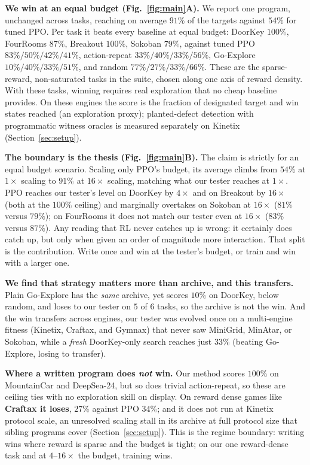 \documentclass{article}
\begin{document}
\textbf{We win at an equal budget (Fig.~\ref{fig:main}A).} We report one program, unchanged across tasks, reaching on average
$91\%$ of the targets against $54\%$ for tuned PPO. Per task it beats every baseline at equal budget: DoorKey $100\%$,
FourRooms $87\%$, Breakout $100\%$, Sokoban $79\%$, against tuned PPO $83\%/50\%/42\%/41\%$, action-repeat
$33\%/40\%/33\%/56\%$, Go-Explore $10\%/40\%/33\%/51\%$, and random $77\%/27\%/33\%/66\%$. These are the sparse-reward,
non-saturated tasks in the suite, chosen along one axis of reward density. With these tasks, winning requires real exploration that no
cheap baseline provides. On these engines the score is the fraction of designated target and win states reached (an exploration proxy); planted-defect detection with programmatic witness oracles is measured separately on Kinetix (Section~\ref{sec:setup}).

\textbf{The boundary is the thesis (Fig.~\ref{fig:main}B).} The claim is strictly for an equal budget scenario. Scaling only PPO's budget,
its average climbs from $54\%$ at $1\times$ scaling to $91\%$ at $16\times$ scaling, matching what our tester reaches at $1\times$. PPO reaches our tester's level on DoorKey by $4\times$ and on Breakout by $16\times$ (both at the $100\%$ ceiling) and marginally overtakes on Sokoban at $16\times$ ($81\%$ versus $79\%$); on FourRooms it does not match our tester even at $16\times$ ($83\%$ versus $87\%$). Any reading that RL never catches up is wrong: it certainly does catch up, but only when given an order of magnitude more interaction. That split is the contribution. Write
once and win at the tester's budget, or train and win with a larger one.

\textbf{We find that strategy matters more than archive, and this transfers.} Plain Go-Explore has the \emph{same} archive, yet scores $10\%$ on
DoorKey, below random, and loses to our tester on $5$ of $6$ tasks, so the archive is not the win. And the win transfers
across engines, our tester was evolved once on a multi-engine fitness (Kinetix, Craftax, and Gymnax) that never saw
MiniGrid, MinAtar, or Sokoban, while a \emph{fresh} DoorKey-only search reaches just $33\%$ (beating Go-Explore, losing to
transfer). 

\textbf{Where a written program does \emph{not} win.} Our method scores $100\%$ on MountainCar and DeepSea-24, but so does trivial action-repeat, so these are ceiling ties with no exploration skill on display. On reward dense games like \textbf{Craftax it loses}, $27\%$ against PPO $34\%$; and it does not run at Kinetix
protocol scale, an unresolved scaling stall in its archive at full protocol size that sibling programs cover (Section~\ref{sec:setup}). This is the
regime boundary: writing wins where reward is sparse and the budget is tight; on our one reward-dense task and at
$4$--$16\times$ the budget, training wins.
\end{document}

